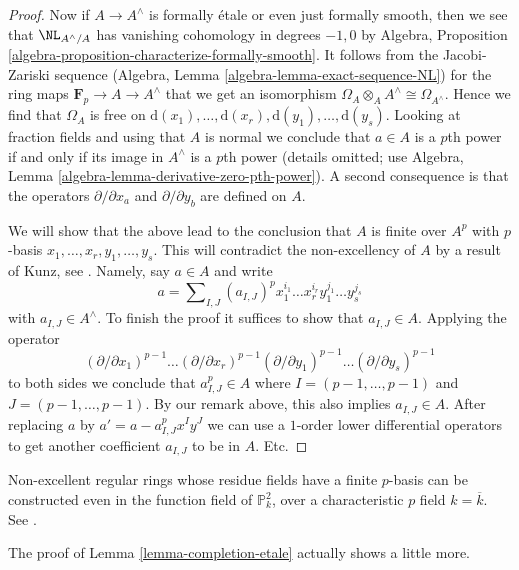 \begin{proof}
\medskip\noindent
Now if $A \to A^\wedge$ is formally \'etale or even just formally smooth,
then we see that $\NL_{A^\wedge/A}$ has vanishing cohomology in degrees $-1, 0$
by Algebra, Proposition \ref{algebra-proposition-characterize-formally-smooth}.
It follows from the Jacobi-Zariski sequence
(Algebra, Lemma \ref{algebra-lemma-exact-sequence-NL}) for the ring
maps $\mathbf{F}_p \to A \to A^\wedge$ that we get an isomorphism
$\Omega_A \otimes_A A^\wedge \cong \Omega_{A^\wedge}$.
Hence we find that $\Omega_A$ is free on
$\text{d}(x_1), \ldots, \text{d}(x_r), \text{d}(y_1), \ldots, \text{d}(y_s)$.
Looking at fraction fields and using that $A$ is normal
we conclude that $a \in A$ is a $p$th power if and only if its image in
$A^\wedge$ is a $p$th power (details omitted; use
Algebra, Lemma \ref{algebra-lemma-derivative-zero-pth-power}).
A second consequence is that the operators $\partial/\partial x_a$ and
$\partial/\partial y_b$ are defined on $A$.

\medskip\noindent
We will show that the above lead to the conclusion that $A$ is finite
over $A^p$ with $p$-basis $x_1, \ldots, x_r, y_1, \ldots, y_s$.
This will contradict the non-excellency of $A$ by a result of
Kunz, see \cite[Corollary 2.6]{Kun76}.
Namely, say $a \in A$ and write
$$
a =  \sum\nolimits_{I, J} (a_{I, J})^p
x_1^{i_1} \ldots x_r^{i_r} y_1^{j_1} \ldots y_s^{j_s}
$$
with $a_{I, J} \in A^\wedge$. To finish the proof it suffices to
show that $a_{I, J} \in A$. Applying the operator
$$
(\partial/\partial x_1)^{p - 1} \ldots
(\partial/\partial x_r)^{p - 1}
(\partial/\partial y_1)^{p - 1} \ldots
(\partial/\partial y_s)^{p - 1}
$$
to both sides we conclude that $a_{I, J}^p \in A$ where
$I = (p - 1, \ldots, p - 1)$ and $J = (p - 1, \ldots, p - 1)$.
By our remark above, this also implies $a_{I, J} \in A$.
After replacing $a$ by $a' = a - a_{I, J}^p x^I y^J$
we can use a $1$-order lower differential operators to get
another coefficient $a_{I, J}$ to be in $A$. Etc.
\end{proof}

\begin{remark}
\label{remark-reference-existence-regular-nonexcellent-rings}
Non-excellent regular rings whose residue fields have a finite $p$-basis
can be constructed even in the function field of $\mathbb{P}^2_k$, over a 
characteristic $p$ field $k = \overline{k}$. See
\cite[$\mathsection 4.1$]{DS18}.
\end{remark}

\noindent
The proof of Lemma \ref{lemma-completion-etale} actually shows a little more.

